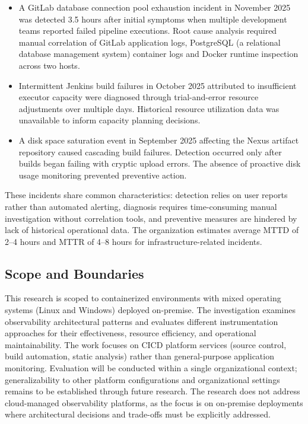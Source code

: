 \begin{itemize}
    \item A GitLab database connection pool exhaustion incident in November 2025 was detected 3.5 hours after initial symptoms when multiple development teams reported failed pipeline executions. Root cause analysis required manual correlation of GitLab application logs, PostgreSQL (a relational database management system) container logs and Docker runtime inspection across two hosts.
    \item Intermittent Jenkins build failures in October 2025 attributed to insufficient executor capacity were diagnosed through trial-and-error resource adjustments over multiple days. Historical resource utilization data was unavailable to inform capacity planning decisions.
    \item A disk space saturation event in September 2025 affecting the Nexus artifact repository caused cascading build failures. Detection occurred only after builds began failing with cryptic upload errors. The absence of proactive disk usage monitoring prevented preventive action.
\end{itemize}

These incidents share common characteristics: detection relies on user reports rather than automated alerting, diagnosis requires time-consuming manual investigation without correlation tools, and preventive measures are hindered by lack of historical operational data. The organization estimates average \ac{MTTD} of 2--4 hours and \ac{MTTR} of 4--8 hours for infrastructure-related incidents.


\subsection{Scope and Boundaries}
This research is scoped to containerized environments with mixed operating systems (Linux and Windows) deployed on-premise. The investigation examines observability architectural patterns and evaluates different instrumentation approaches for their effectiveness, resource efficiency, and operational maintainability. The work focuses on \ac{CICD} platform services (source control, build automation, static analysis) rather than general-purpose application monitoring. Evaluation will be conducted within a single organizational context; generalizability to other platform configurations and organizational settings remains to be established through future research. The research does not address cloud-managed observability platforms, as the focus is on on-premise deployments where architectural decisions and trade-offs must be explicitly addressed.

